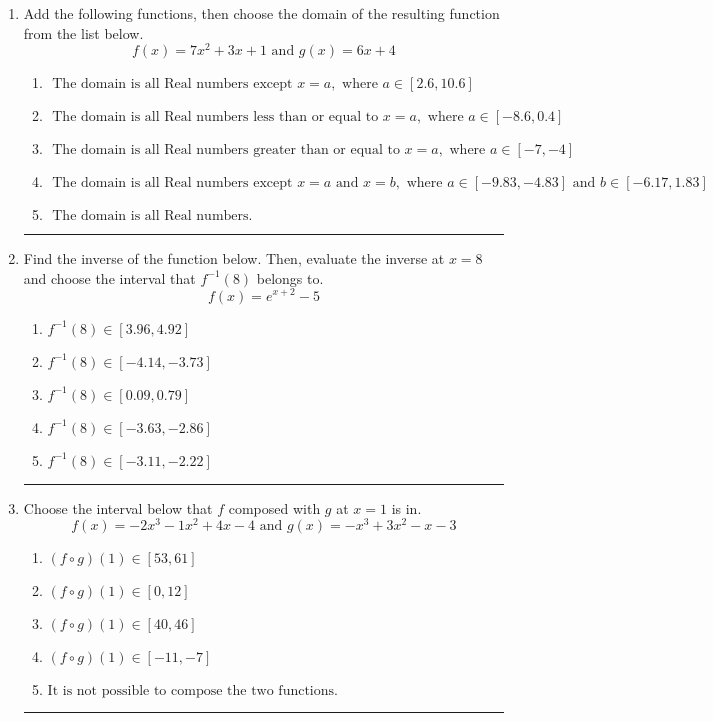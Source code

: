 \documentclass[14pt]{extbook}
\newcommand{\litem}[1]{\item#1\hspace*{-1cm}\rule{\textwidth}{0.4pt}}
\begin{document}
\begin{enumerate}
\litem{
Add the following functions, then choose the domain of the resulting function from the list below.\[ f(x) = 7x^{2} +3 x + 1 \text{ and } g(x) = 6x + 4 \]\begin{enumerate}[label=\Alph*.]
\item \( \text{ The domain is all Real numbers except } x = a, \text{ where } a \in [2.6, 10.6] \)
\item \( \text{ The domain is all Real numbers less than or equal to } x = a, \text{ where } a \in [-8.6, 0.4] \)
\item \( \text{ The domain is all Real numbers greater than or equal to } x = a, \text{ where } a \in [-7, -4] \)
\item \( \text{ The domain is all Real numbers except } x = a \text{ and } x = b, \text{ where } a \in [-9.83, -4.83] \text{ and } b \in [-6.17, 1.83] \)
\item \( \text{ The domain is all Real numbers. } \)

\end{enumerate} }
\litem{
Find the inverse of the function below. Then, evaluate the inverse at $x = 8$ and choose the interval that $f^{-1}(8)$ belongs to.\[ f(x) = e^{x+2}-5 \]\begin{enumerate}[label=\Alph*.]
\item \( f^{-1}(8) \in [3.96, 4.92] \)
\item \( f^{-1}(8) \in [-4.14, -3.73] \)
\item \( f^{-1}(8) \in [0.09, 0.79] \)
\item \( f^{-1}(8) \in [-3.63, -2.86] \)
\item \( f^{-1}(8) \in [-3.11, -2.22] \)

\end{enumerate} }
\litem{
Choose the interval below that $f$ composed with $g$ at $x=1$ is in.\[ f(x) = -2x^{3} -1 x^{2} +4 x -4 \text{ and } g(x) = -x^{3} +3 x^{2} -x -3 \]\begin{enumerate}[label=\Alph*.]
\item \( (f \circ g)(1) \in [53, 61] \)
\item \( (f \circ g)(1) \in [0, 12] \)
\item \( (f \circ g)(1) \in [40, 46] \)
\item \( (f \circ g)(1) \in [-11, -7] \)
\item \( \text{It is not possible to compose the two functions.} \)


\end{enumerate}}
\end{enumerate}
\end{document}
